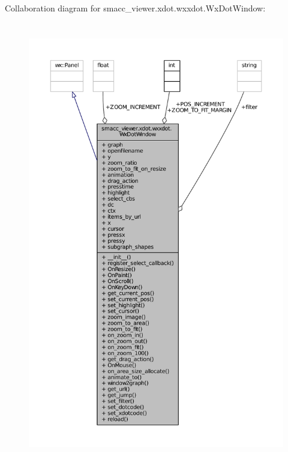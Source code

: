 Collaboration diagram for smacc\+\_\+viewer.\+xdot.\+wxxdot.\+Wx\+Dot\+Window\+:
\nopagebreak
\begin{figure}[H]
\begin{center}
\leavevmode
\includegraphics[height=550pt]{classsmacc__viewer_1_1xdot_1_1wxxdot_1_1WxDotWindow__coll__graph}
\end{center}
\end{figure}
